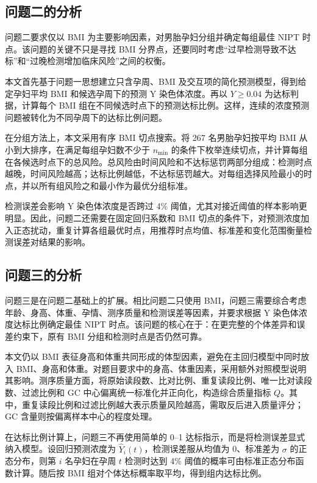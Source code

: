 \documentclass[UTF8,zihao=-4]{ctexart}
\numberwithin{equation}{section}
\begin{document}
\subsection{问题二的分析}

问题二要求仅以 BMI 为主要影响因素，对男胎孕妇分组并确定每组最佳 NIPT 时点。该问题的关键不只是寻找 BMI 分界点，还要同时考虑“过早检测导致不达标”和“过晚检测增加临床风险”之间的权衡。

本文首先基于问题一思想建立只含孕周、BMI 及交互项的简化预测模型，得到给定孕妇平均 BMI 和候选孕周下的预测 Y 染色体浓度。再以 $Y\ge 0.04$ 为达标判据，计算每个 BMI 组在不同候选时点下的预测达标比例。这样，连续的浓度预测问题被转化为不同孕周下的达标比例问题。

在分组方法上，本文采用有序 BMI 切点搜索。将 267 名男胎孕妇按平均 BMI 从小到大排序，在满足每组孕妇数不少于 $n_{\min}$ 的条件下枚举连续切点，并计算每组在各候选时点下的总风险。总风险由时间风险和不达标惩罚两部分组成：检测时点越晚，时间风险越高；达标比例越低，不达标惩罚越大。对每组选择风险最小的时点，并以所有组风险之和最小作为最优分组标准。

检测误差会影响 Y 染色体浓度是否跨过 4\% 阈值，尤其对接近阈值的样本影响更明显。因此，问题二还需要在固定回归系数和 BMI 切点的条件下，对预测浓度加入正态扰动，重复计算各组最优时点，用推荐时点均值、标准差和变化范围衡量检测误差对结果的影响。

\subsection{问题三的分析}

问题三是在问题二基础上的扩展。相比问题二只使用 BMI，问题三需要综合考虑年龄、身高、体重、孕情、测序质量和检测误差等因素，并要求根据 Y 染色体浓度达标比例确定最佳 NIPT 时点。该问题的核心在于：在更完整的个体差异和误差约束下，原有 BMI 分组和检测时点是否仍然可靠。

本文仍以 BMI 表征身高和体重共同形成的体型因素，避免在主回归模型中同时放入 BMI、身高和体重。对题目要求中的身高、体重因素，采用额外对照模型说明其影响。测序质量方面，将原始读段数、比对比例、重复读段比例、唯一比对读段数、过滤比例和 GC 中心偏离统一标准化并正向化，构造综合质量指标 $Q$。其中，重复读段比例和过滤比例越大表示质量风险越高，需取反后进入质量评分；GC 含量则按偏离样本中心的程度处理。

在达标比例计算上，问题三不再使用简单的 0--1 达标指示，而是将检测误差显式纳入模型。设回归预测浓度为 $\hat{Y}_i(t)$，检测误差服从均值为 0、标准差为 $\sigma$ 的正态分布，则第 $i$ 名孕妇在孕周 $t$ 检测时达到 4\% 阈值的概率可由标准正态分布函数计算。随后按 BMI 组对个体达标概率取平均，得到组内达标比例。
\end{document}

